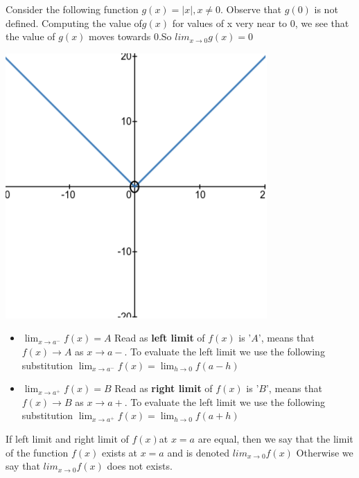 \documentclass[12pt]{article}
\begin{document}
Consider the following function $g(x)=|x|,x \not = 0$. Observe that $g(0)$ is not defined.
Computing the value of$ g(x)$ for values of x very
near to $0$, we see that the value of $g(x)$ moves
towards $0$.So $lim _{x \rightarrow 0} g(x)=0$
\begin{center}
    \includegraphics*[scale=0.3]{2.png}

\end{center}

\begin{itemize}
    \item $\lim _{x \rightarrow a^{-}} f(x)=A$ Read as \textbf{left limit} of $f(x)$ is '$A$', means that $f(x) \rightarrow A$ as $x \rightarrow a-$. To evaluate the left limit we use the following substitution $\lim _{x \rightarrow a^{-}} f(x)=\lim _{h \rightarrow 0} f(a-h)$
    \item $\lim _{x \rightarrow a^{+}} f(x)=B$  Read as \textbf{right limit} of $f(x)$ is '$B$', means that $f(x) \rightarrow B$ as $x \rightarrow a+$. To evaluate the left limit we use the following substitution $\lim _{x \rightarrow a^{+}} f(x)=\lim _{h \rightarrow 0} f(a+h)$
\end{itemize} 


If left limit and right limit of $f(x) $at $x = a$ are equal, then we say that the limit of the function $f(x)$ exists at $x = a$ and is denoted
$lim _{x \rightarrow 0} f(x)$ Otherwise we say that $lim _{x \rightarrow 0} f(x)$ does not exists.
\end{document}
